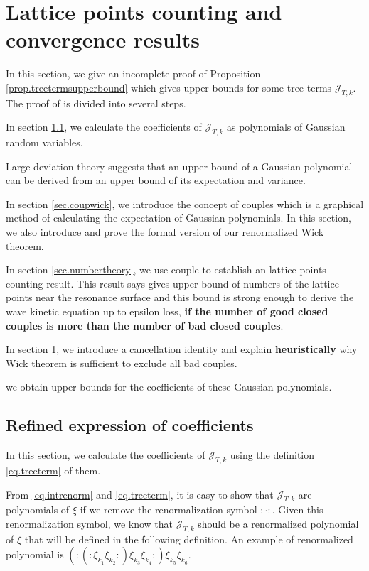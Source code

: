 \section{Lattice points counting and convergence results}
In this section, we give an incomplete proof of Proposition \ref{prop.treetermsupperbound} which gives upper bounds for some tree terms $\mathcal{J}_{T,k}$. The proof of is divided into several steps.

In section \ref{sec.refexp}, we calculate the coefficients of $\mathcal{J}_{T,k}$ as polynomials of Gaussian random variables.

Large deviation theory suggests that an upper bound of a Gaussian polynomial can be derived from an upper bound of its expectation and variance.

In section \ref{sec.coupwick}, we introduce the concept of couples which is a graphical method of calculating the expectation of Gaussian polynomials. In this section, we also introduce and prove the formal version of our renormalized Wick theorem.

In section \ref{sec.numbertheory}, we use couple to establish an lattice points counting result. This result says gives upper bound of numbers of the lattice points near the resonance surface and this bound is strong enough to derive the wave kinetic equation up to epsilon loss, \textbf{if the number of good closed couples is more than the number of bad closed couples}.

In section \ref{}, we introduce a cancellation identity and explain \textbf{heuristically} why Wick theorem is sufficient to exclude all bad couples.

we obtain upper bounds for the coefficients of these Gaussian polynomials.





\subsection{Refined expression of coefficients}\label{sec.refexp} In this section, we calculate the coefficients of $\mathcal{J}_{T,k}$ using the definition \eqref{eq.treeterm} of them.



From \eqref{eq.intrenorm} and \eqref{eq.treeterm}, it is easy to show that $\mathcal{J}_{T,k}$ are polynomials of $\xi$ if we remove the renormalization symbol $:\cdot:$. Given this renormalization symbol, we know that $\mathcal{J}_{T,k}$ should be a renormalized polynomial of $\xi$ that will be defined in the following definition. An example of renormalized polynomial is $(:(:\xi_{k_1}\bar{\xi}_{k_2}:)\xi_{k_3}\bar{\xi}_{k_4}:)\bar{\xi}_{k_5}\xi_{k_6}$.

